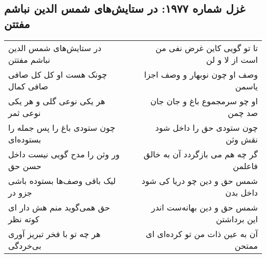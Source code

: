 \begin{center}
\section*{غزل شماره ۱۹۷۷: در ستایش‌های شمس الدین نباشم مفتتن}
\label{sec:1977}
\begin{longtable}{l p{0.5cm} r}
در ستایش‌های شمس الدین نباشم مفتتن
&&
تا تو گویی کاین غرض نفی من است از لا و لن
\\
چونک هست او کل کل صافی صافی کمال
&&
وصف او چون نوبهار و وصف اجزا یاسمن
\\
هر یکی نوعی گلی و هر یکی نوعی ثمر
&&
او چو سرمجموع باغ و جان جان صد چمن
\\
چون ستودی باغ را پس جمله را بستوده‌ای
&&
چون ستودی حق را داخل شود نقش وثن
\\
ور وثن را مدح گویی نیست داخل حسن حق
&&
گر چه هم می بازگردد آن به خالق فاعلمن
\\
لیک باقی وصف‌ها بستوده باشی جزو در
&&
شمس حق و دین چو دریا کی شود داخل بدن
\\
حق همی‌گوید منم هش دار ای کوته نظر
&&
شمس حق و دین بهانه‌ست اندر این برداشتن
\\
هر چه تو با فخر تبریز آوری بی‌خردگی
&&
آن به عین ذات من تو کرده‌ای ای ممتحن
\\
\end{longtable}
\end{center}
